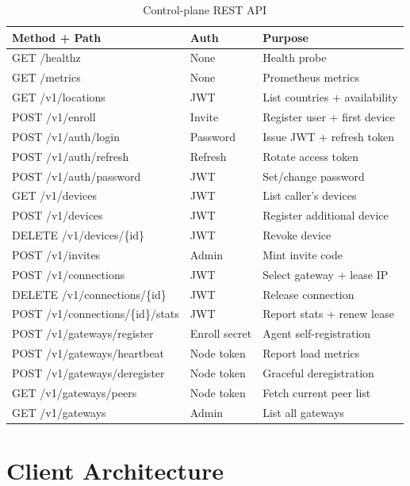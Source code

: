 \documentclass[12pt,a4paper]{report}
\begin{document}
\begin{table}[H]
\centering\small
\caption{Control-plane REST API}
\label{tab:api}
\begin{tabular}{lll}
\toprule
\textbf{Method + Path} & \textbf{Auth} & \textbf{Purpose}\\
\midrule
GET /healthz & None & Health probe\\
GET /metrics & None & Prometheus metrics\\
GET /v1/locations & JWT & List countries + availability\\
POST /v1/enroll & Invite & Register user + first device\\
POST /v1/auth/login & Password & Issue JWT + refresh token\\
POST /v1/auth/refresh & Refresh & Rotate access token\\
POST /v1/auth/password & JWT & Set/change password\\
GET /v1/devices & JWT & List caller's devices\\
POST /v1/devices & JWT & Register additional device\\
DELETE /v1/devices/\{id\} & JWT & Revoke device\\
POST /v1/invites & Admin & Mint invite code\\
POST /v1/connections & JWT & Select gateway + lease IP\\
DELETE /v1/connections/\{id\} & JWT & Release connection\\
POST /v1/connections/\{id\}/stats & JWT & Report stats + renew lease\\
POST /v1/gateways/register & Enroll secret & Agent self-registration\\
POST /v1/gateways/heartbeat & Node token & Report load metrics\\
POST /v1/gateways/deregister & Node token & Graceful deregistration\\
GET /v1/gateways/peers & Node token & Fetch current peer list\\
GET /v1/gateways & Admin & List all gateways\\
\bottomrule
\end{tabular}
\end{table}

\section{Client Architecture}
\end{document}
